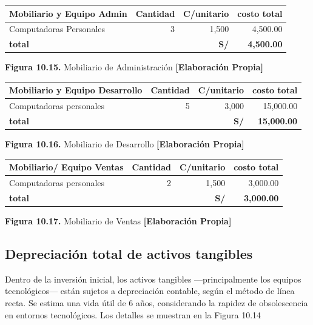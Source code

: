 \begin{table}[H]
\centering
\scriptsize
\renewcommand{\arraystretch}{1.2}
\setlength{\tabcolsep}{8pt}
\begin{tabular}{|l|r|r|r|}
\hline
\textbf{Mobiliario y Equipo Admin} & \textbf{Cantidad} & \textbf{C/unitario} & \textbf{costo total} \\ \hline
Computadoras Personales & 3 & 1,500 & 4,500.00 \\ \hline
\textbf{total} &  & \textbf{S/} & \textbf{4,500.00} \\ \hline
\end{tabular}

\vspace{0.2cm}
\textbf{Figura 10.15.} Mobiliario de Administración \textbf{[Elaboración Propia]}
\end{table}

\begin{table}[H]
\centering
\scriptsize
\renewcommand{\arraystretch}{1.2}
\setlength{\tabcolsep}{8pt}
\begin{tabular}{|l|r|r|r|}
\hline
\textbf{Mobiliario y Equipo Desarrollo} & \textbf{Cantidad} & \textbf{C/unitario} & \textbf{costo total} \\ \hline
Computadoras personales & 5 & 3,000 & 15,000.00 \\ \hline
\textbf{total} &  & \textbf{S/} & \textbf{15,000.00} \\ \hline
\end{tabular}

\vspace{0.2cm}
\textbf{Figura 10.16.} Mobiliario de Desarrollo \textbf{[Elaboración Propia]}
\end{table}

\begin{table}[H]
\centering
\scriptsize
\renewcommand{\arraystretch}{1.2}
\setlength{\tabcolsep}{8pt}
\begin{tabular}{|l|r|r|r|}
\hline
\textbf{Mobiliario/ Equipo Ventas} & \textbf{Cantidad} & \textbf{C/unitario} & \textbf{costo total} \\ \hline
Computadoras personales & 2 & 1,500 & 3,000.00 \\ \hline
\textbf{total} &  & \textbf{S/} & \textbf{3,000.00} \\ \hline
\end{tabular}

\vspace{0.2cm}
\textbf{Figura 10.17.} Mobiliario de Ventas \textbf{[Elaboración Propia]}
\end{table}

\subsection{Depreciación total de activos tangibles}

Dentro de la inversión inicial, los activos tangibles ---principalmente los equipos tecnológicos--- están sujetos a depreciación contable, según el método de línea recta. Se estima una vida útil de 6 años, considerando la rapidez de obsolescencia en entornos tecnológicos. Los detalles se muestran en la Figura 10.14
